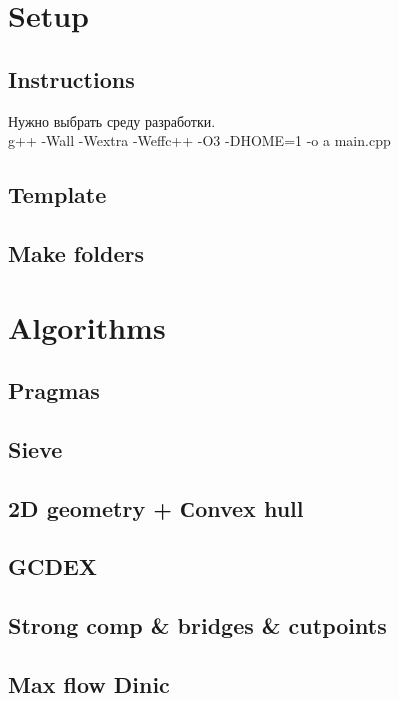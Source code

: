 \documentclass{article}
\begin{document}
\begin{multicols}{2}

\tableofcontents

\section{Setup}
\subsection{Instructions}
Нужно выбрать среду разработки.
\\ g++ -Wall -Wextra -Weffc++ -O3 -DHOME=1 -o a main.cpp
\subsection{Template}

\subsection{Make folders}

\section{Algorithms}
\subsection{Pragmas}

\subsection{Sieve}

\subsection{2D geometry + Сonvex hull}

\subsection{GCDEX}

\subsection{Strong comp \& bridges \& cutpoints}

\subsection{Max flow Dinic}


\end{multicols}
\end{document}
